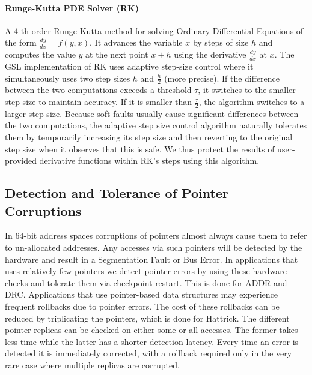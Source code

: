\documentclass[10pt, conference, compsocconf]{IEEEtran}
\begin{document}
\paragraph{Runge-Kutta PDE Solver (RK)}
A 4-th order Runge-Kutta method for solving Ordinary Differential Equations of the form $\frac{dy}{dx} = f(y, x)$.
It advances the variable $x$ by steps of size $h$ and computes the value $y$ at the next point $x+h$ using the derivative $\frac{dy}{dx}$ at $x$.
The GSL implementation of RK uses adaptive step-size control where it simultaneously uses two step sizes $h$ and $\frac{h}{2}$ (more precise).
If the difference between the two computations exceeds a threshold $\tau$, it switches to the smaller step size to maintain accuracy.%
If it is smaller than $\frac{\tau}{2}$, the algorithm switches to a larger step size.
Because soft faults usually cause significant differences between the two computations, the adaptive step size control algorithm naturally tolerates them by temporarily increasing its step size and then reverting to the original step size when it observes that this is safe.
We thus protect the results of user-provided derivative functions within RK's steps using this algorithm.

\vspace{-10pt}
\subsection{Detection and Tolerance of Pointer Corruptions}
\vspace{-10pt}
\label{sec:res_tech:pointers}
In 64-bit address spaces corruptions of pointers almost always cause them to refer to un-allocated addresses.
Any accesses via such pointers will be detected by the hardware and result in a Segmentation Fault or Bus Error.
In applications that uses relatively few pointers we detect pointer errors by using these hardware checks and tolerate them via checkpoint-restart.
This is done for ADDR and DRC.
Applications that use pointer-based data structures may experience frequent rollbacks due to pointer errors.
The cost of these rollbacks can be reduced by triplicating the pointers, which is done for Hattrick.
The different pointer replicas can be checked on either some or all accesses.
The former takes less time while the latter has a shorter detection latency.
Every time an error is detected it is immediately corrected, with a rollback required only in the very rare case where multiple replicas are corrupted.
\end{document}
